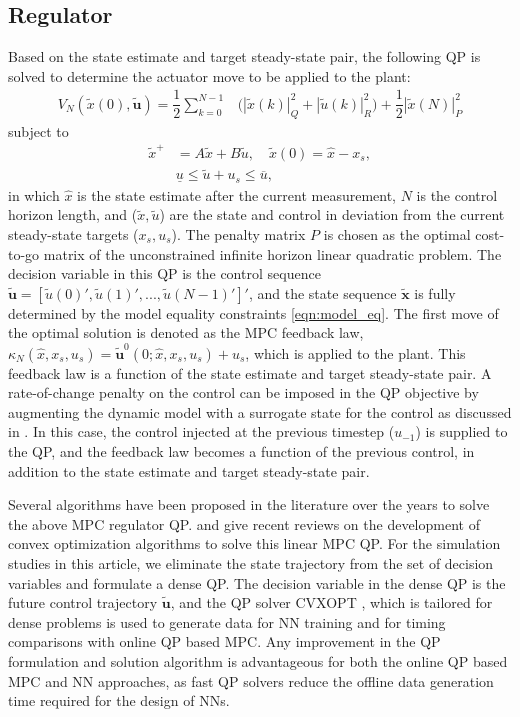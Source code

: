 \documentclass[preprint,5p, twocolumn, authoryear]{elsarticle}
\newcommand{\xhat}{\hat{x}}
\newcommand{\xseq}{\mathbf{x}}
\begin{document}
\subsection{Regulator}
Based on the state estimate and target steady-state pair, the following QP is
solved to determine the actuator move to be applied to the plant:
\begin{align} \label{eqn:regulator}
    V_N(\tilde{x}(0), \mathbf{\tilde{u}}) = \dfrac{1}{2}\sum_{k=0}^{N-1} & 
    \Big(|\tilde{x}(k)|^2_Q  + |\tilde{u}(k)|^2_R \Big) + 
    \dfrac{1}{2}|\tilde{x}(N)|^2_P
\end{align}
subject to 
\begin{align}
    \tilde{x}^+ &= A\tilde{x} + B\tilde{u}, \quad \tilde{x}(0) = \xhat - x_s, \label{eqn:model_eq} \\
    &\underline{u} \leq \tilde{u} + u_s \leq \overline{u},
    \label{eqn:regulator_constraints}
\end{align}
in which $\xhat$ is the state estimate after the current measurement, $N$ is the
control horizon length, and ($\tilde{x}, \tilde{u}$) are the state and control
in deviation from the current steady-state targets ($x_s, u_s$). The penalty
matrix $P$ is chosen as the optimal cost-to-go matrix of the unconstrained
infinite horizon linear quadratic problem. The decision variable in this QP is
the control sequence $\mathbf{\tilde{u}} = [\tilde{u}(0)', \tilde{u}(1)', ...,
\tilde{u}(N-1)']'$, and the state sequence $\tilde{\xseq}$ is fully determined
by the model equality constraints \eqref{eqn:model_eq}. The first move of the
optimal solution is denoted as the MPC feedback law, $\kappa_N(\xhat, x_s, u_s)
= \mathbf{\tilde{u}}^0(0;\xhat, x_s, u_s) + u_s$, which is applied to the plant.
This feedback law is a function of the state estimate and target steady-state
pair. A rate-of-change penalty on the control can be imposed in the QP objective
by augmenting the dynamic model with a surrogate state for the control as
discussed in \cite{rao:rawlings:1999}. In this case, the control injected at the
previous timestep ($u_{-1}$) is supplied to the QP, and the feedback law becomes
a function of the previous control, in addition to the state estimate and target
steady-state pair.

Several algorithms have been proposed in the literature over the years to solve
the above MPC regulator QP. \cite{kouzoupis:frison:zanelli:diehl:2018} and
\cite{wright:2019} give recent reviews on the development of convex optimization
algorithms to solve this linear MPC QP. For the simulation studies in this
article, we eliminate the state trajectory from the set of decision variables
and formulate a dense QP. The decision variable in the dense QP is the future
control trajectory $\mathbf{\tilde{u}}$, and the QP solver CVXOPT
\citep{vandenberghe:2010}, which is tailored for dense problems is used to
generate data for NN training and for timing comparisons with online QP based
MPC. Any improvement in the QP formulation and solution algorithm is
advantageous for both the online QP based MPC and NN approaches, as fast QP
solvers reduce the offline data generation time required for the design of NNs.
\end{document}
